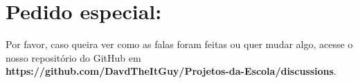 \section{Pedido especial:}
Por favor, caso queira ver como as falas foram feitas ou quer mudar algo, acesse o nosso repositório do GitHub em \textbf{https://github.com/DavdTheItGuy/Projetos-da-Escola/discussions}.
